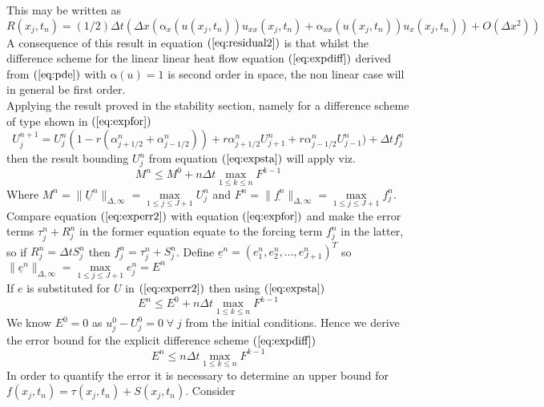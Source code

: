 \documentclass[11pt]{article}
\newcommand{\D}{\Delta}
\newcommand{\al}{\mathrm{\alpha}}
\begin{document}
This may be written as
\begin{equation} 
\label{eq:residual3}
 R(x_j,t_n) = (1/2)\D{t}\left(\D{x}\left(  \al_x(u(x_j,t_n))u_{xx}(x_j,t_n) +  \al_{xx}(u(x_j,t_n))u_{x}(x_j,t_n)              \right )    + O(\D{x^2}  )\right) 
\end{equation} 
A consequence of this result in equation $(\ref{eq:residual2} )$ is that whilst the difference scheme for the linear linear heat flow equation $(\ref{eq:expdiff})$ derived from $(\ref{eq:pde})$ with $\al(u) = 1$ is second order in space, the non linear case will in general be first order.\\
Applying the result proved in the stability section, namely for a difference scheme of type shown in $(\ref{eq:expfor})$ 
\begin{equation*}
U_j^{n+1} = U_j^n(1 - r(\alpha_{j+1/2}^n+\alpha_{j-1/2}^n)) + r\alpha_{j+1/2}^nU_{j+1}^n +r\alpha_{j-1/2}^nU_{j-1}^n) + \D{t}f_j^n 
\end{equation*}
then the result bounding $U_j^n$ from equation $(\ref{eq:expsta})$ will apply viz.
\begin{equation*}
M^n \leq M^0 + n\D{t}\max_{1\leq{k}\leq{n}}{F^{k-1}}
\end{equation*}
Where $M^n = \|{\underline{U}^n}\|_{\D,\infty} = \max\limits_{1\leq{j}\leq{J+1}   }{U_j^n}  $ and $ F^n = \|{\underline{f^n}\|_{\D,\infty}} = \max\limits_{1\leq{j}\leq{J+1}   }{f_j^n} $.\\
Compare equation $(\ref{eq:experr2})$ with equation $(\ref{eq:expfor})$ and make the error terms $\tau_j^n +R_j^n$ in the former equation equate to the forcing term $f_j^n$ in the latter, so if $R_j^n = \D{t}S_j^n$ then $f_j^n = \tau_j^n + S_j^n$. 
Define $\underline{e}^n={(e_1^n,e_2^n,...,e_{J+1}^n)}^T$ so $\|{\underline{e}^n}\|_{\D,\infty} = \max\limits_{1\leq{j}\leq{J+1}   }{e_j^n} = E^n $\\
If $e$ is substituted for $U$ in $(\ref{eq:experr2})$ then using $(\ref{eq:expsta})$
\begin{equation*}
E^n \leq E^0 + n\D{t}\max_{1\leq{k}\leq{n}}F^{k-1}
\end{equation*}  
We know $E^0 = 0$ as $u_j^0 - U_j^0 = 0\; \forall\; {j}$ \;from the initial conditions.
Hence we derive the error bound for the explicit difference scheme $(\ref{eq:expdiff})$
\begin{equation}
\label{eq:experr3}
 E^n \leq  n\D{t}\max_{1\leq{k}\leq{n}}F^{k-1}
\end{equation}
In order to quantify the error it is necessary to determine an upper bound for $f(x_j,t_n) = \tau(x_j,t_n) + S(x_j,t_n)$. Consider 
\end{document}
